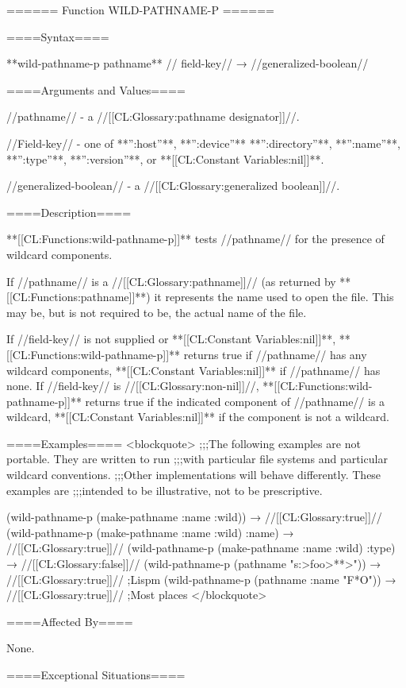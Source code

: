 ====== Function WILD-PATHNAME-P ======

====Syntax====

**wild-pathname-p {pathname** //\opt} field-key// → //generalized-boolean//

====Arguments and Values====

//pathname// - a //[[CL:Glossary:pathname designator]]//.

//Field-key// - one of **'':host''**, **'':device''** **'':directory''**, **'':name''**, **'':type''**, **'':version''**, or **[[CL:Constant Variables:nil]]**.

//generalized-boolean// - a //[[CL:Glossary:generalized boolean]]//.

====Description====

**[[CL:Functions:wild-pathname-p]]** tests //pathname// for the presence of wildcard components.

If //pathname// is a //[[CL:Glossary:pathname]]// (as returned by **[[CL:Functions:pathname]]**) it represents the name used to open the file. This may be, but is not required to be, the actual name of the file.

If //field-key// is not supplied or **[[CL:Constant Variables:nil]]**, **[[CL:Functions:wild-pathname-p]]** returns true if //pathname// has any wildcard components, **[[CL:Constant Variables:nil]]** if //pathname// has none. If //field-key// is //[[CL:Glossary:non-nil]]//, **[[CL:Functions:wild-pathname-p]]** returns true if the indicated component of //pathname// is a wildcard, **[[CL:Constant Variables:nil]]** if the component is not a wildcard.

====Examples==== <blockquote> ;;;The following examples are not portable. They are written to run ;;;with particular file systems and particular wildcard conventions. ;;;Other implementations will behave differently. These examples are ;;;intended to be illustrative, not to be prescriptive.

(wild-pathname-p (make-pathname :name :wild)) → //[[CL:Glossary:true]]// (wild-pathname-p (make-pathname :name :wild) :name) → //[[CL:Glossary:true]]// (wild-pathname-p (make-pathname :name :wild) :type) → //[[CL:Glossary:false]]// (wild-pathname-p (pathname "s:>foo>**>")) → //[[CL:Glossary:true]]// ;Lispm (wild-pathname-p (pathname :name "F*O")) → //[[CL:Glossary:true]]// ;Most places </blockquote>

====Affected By====

None.

====Exceptional Situations====

